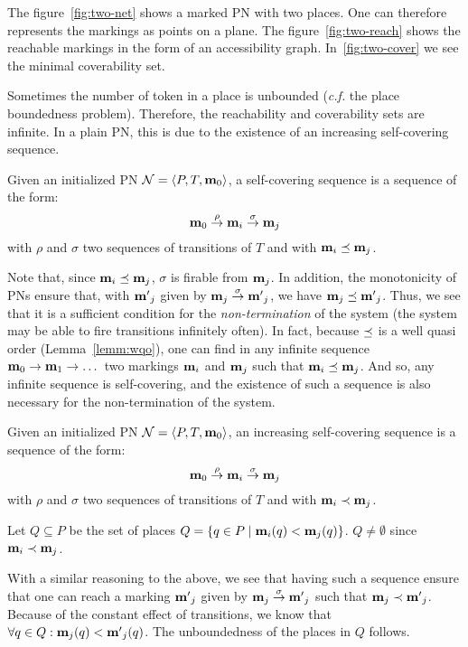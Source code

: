 The figure~\ref{fig:two-net} shows a marked \ac{PN} with two places.
One can therefore represents the markings as points on a plane.
The figure~\ref{fig:two-reach} shows the reachable markings in the form of an accessibility graph.
In~\ref{fig:two-cover} we see the minimal coverability set.

Sometimes the number of token in a place is unbounded (\textit{c.f.} the place boundedness problem).
Therefore, the reachability and coverability sets are infinite.
In a plain \ac{PN}, this is due to the existence of an increasing self-covering sequence.
\begin{defi}
  Given an initialized \ac{PN} $\mathcal{N} = \langle P,T, \mathbf{m}_0\rangle$,
  a self-covering sequence is a sequence of the form:
  \[
    \mathbf{m}_0 \stackrel{\rho}{\to} \mathbf{m}_i \stackrel{\sigma}{\to} \mathbf{m}_j
  \]
  with $\rho$ and $\sigma$ two sequences of transitions of $T$
  and with $\mathbf{m}_i \preceq \mathbf{m}_j$.
\end{defi}

Note that, since $\mathbf{m}_i \preceq \mathbf{m}_j$, $\sigma$ is firable from $\mathbf{m}_j$.
In addition, the monotonicity of \acp{PN} ensure that, with $\mathbf{m'}_j$ given by $\mathbf{m}_j \stackrel{\sigma}{\to} \mathbf{m'}_j$, we have $\mathbf{m}_j \preceq \mathbf{m'}_j$.
Thus, we see that it is a sufficient condition for the \emph{non-termination} of the system (the system may be able to fire transitions infinitely often).
In fact, because $\preceq$ is a well quasi order (Lemma~\ref{lemm:wqo}), one can find in any infinite sequence $\mathbf{m}_0 \stackrel{}{\to} \mathbf{m}_1 \stackrel{}{\to} \dots$ two markings $\mathbf{m}_i$ and $\mathbf{m}_j$ such that $\mathbf{m}_i \preceq \mathbf{m}_j$.
And so, any infinite sequence is self-covering, and the existence of such a sequence is also necessary for the non-termination of the system.

\begin{defi}
  Given an initialized \ac{PN} $\mathcal{N} = \langle P,T, \mathbf{m}_0\rangle$,
  an increasing self-covering sequence is a sequence of the form:
  \[
    \mathbf{m}_0 \stackrel{\rho}{\to} \mathbf{m}_i \stackrel{\sigma}{\to} \mathbf{m}_j
  \]
  with $\rho$ and $\sigma$ two sequences of transitions of $T$
  and with $\mathbf{m}_i \prec \mathbf{m}_j$.
\end{defi}

Let $Q \subseteq P$ be the set of places $Q = \{q \in P \mid \mathbf{m}_i(q) < \mathbf{m}_j(q)\}$.
$Q \neq \emptyset$ since $\mathbf{m}_i \prec \mathbf{m}_j$.

With a similar reasoning to the above, we see that having such a sequence ensure that one can reach a marking $\mathbf{m'}_j$ given by $\mathbf{m}_j \stackrel{\sigma}{\to} \mathbf{m'}_j$ such that $\mathbf{m}_j \prec \mathbf{m'}_j$.
Because of the constant effect of transitions, we know that $\forall q \in Q : \mathbf{m}_j(q) < \mathbf{m'}_j(q)$.
The unboundedness of the places in $Q$ follows.



